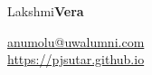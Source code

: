 \documentclass{res}
\begin{document}
	\hspace*{-0.05\textwidth}
	\begin{minipage}[t]{0.6\textwidth}
	\begin{flushleft}
	\vspace*{\fill}
	{\fontsize{45}{45}\selectfont Lakshmi\textbf{Vera}}
	\end{flushleft}
	\end{minipage}
	\begin{minipage}[t]{0.44\textwidth}
	\begin{flushright}
	\href{mailto:anumolu@uwalumni.com}{anumolu@uwalumni.com} \\ \url{https://pjsutar.github.io} \\ 
	\end{flushright}
	\end{minipage}
\end{document}
